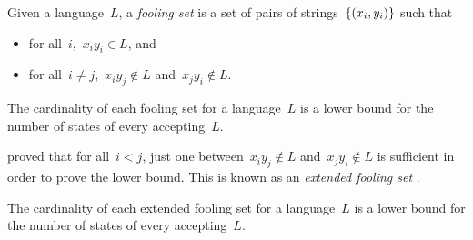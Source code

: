 \begin{defn}
	Given a language~$L$, a \emph{fooling set} is a set of pairs of strings~$\{(x_i,y_i)\}$ such that
	\begin{itemize}
		\item for all~$i$,~$x_iy_i\in L$, and
		\item for all~$i\ne j$,~$x_iy_j\notin L$ and~$x_jy_i\notin L$.
	\end{itemize}
\end{defn}
\begin{thrm}
	The cardinality of each fooling set for a language~$L$ is a lower bound for the number of states of every \ONFA accepting~$L$.
\end{thrm}

\citeauthor{Bir92} proved that for all~$i<j$, just one between~$x_iy_j\notin L$ and~$x_jy_i\notin L$ is sufficient in order to prove the lower bound.
This is known as an \emph{extended fooling set} \cite{Bir92}.
\begin{thrm}
	The cardinality of each extended fooling set for a language~$L$ is a lower bound for the number of states of every \ONFA accepting~$L$.
\end{thrm}
